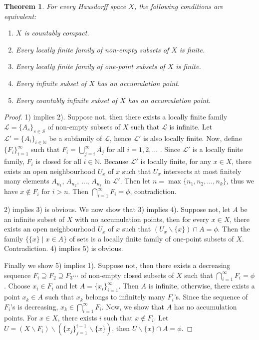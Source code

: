 \documentclass[12pt,oneside,english]{amsbook}
\numberwithin{equation}{section} %
\numberwithin{figure}{section} %
\theoremstyle{plain}
\numberwithin{section}{chapter}
\newtheorem{thm}{Theorem}[section]
\theoremstyle{plain}
\begin{document}
\begin{thm}
  For every Hausdorff space $X$, the following conditions are equivalent:
  \begin{enumerate}
  \item $X$ is countably compact.
  \item Every locally finite family of non-empty subsets of $X$ is finite.
  \item Every locally finite family of one-point subsets of $X$ is finite.
  \item Every infinite subset of $X$ has an accumulation point.
  \item Every countably infinite subset of $X$ has an accumulation point.
  \end{enumerate}
\end{thm}
\begin{proof}
  1) implies 2). Suppose not, then there exists a locally finite family $\mathcal{L} = \{A_{s}\}_{s \in S}$ of non-empty subsets of $X$ such that $\mathcal{L}$ is infinite. Let $\mathcal{L}' = \{A_i\}_{i \in \mathbb{N}}$ be a subfamily of $\mathcal{L}$, hence $\mathcal{L}'$ is also locally finite. Now, define $\{F_i\}_{i = 1}^{\infty}$ such that $F_i = \bigcup_{j = i}^{\infty}\overline{A_j}$ for all $i = 1,2, \ldots$ . Since $\mathcal{L}'$ is a locally finite family, $F_i$ is closed for all $i \in \mathbb{N}$. Because $\mathcal{L}'$ is locally finite, for any $x \in X$, there exists an open neighbourhood $U_x$ of $x$ such that $U_x$ intersects at most finitely many elements $A_{n_1}$, $A_{n_2}$, $\ldots$, $A_{n_k}$ in $\mathcal{L}'$. Then let $n = \max{\{n_1,n_2,\ldots,n_k\}}$, thus we have $x \notin F_i$ for $i > n$. Then $\bigcap_{i = 1}^{\infty}F_i = \phi$, contradiction.

  2) implies 3) is obvious. We now show that 3) implies 4). Suppose not, let $A$ be an infinite subset of $X$ with no accumulation points, then for every $x \in X$, there exists an open neighbourhood $U_x$ of $x$ such that $(U_x\backslash \{x\}) \cap A = \phi$. Then the family $\{\{x\} \; | \; x \in A\}$ of sets is a locally finite family of one-point subsets of $X$. Contradiction. 4) implies 5) is obvious.

  Finally we show 5) implies 1). Suppose not, then there exists a decreasing sequence $F_i \supseteq F_2 \supseteq F_3 \cdots $ of non-empty closed subsets of $X$ such that $\bigcap_{i = 1}^{\infty}F_i = \phi$. Choose $x_i \in F_i$ and let $A = \{x_i\}_{i = 1}^{\infty}$. Then $A$ is infinite, otherwise, there exists a point $x_k \in A$ such that $x_k$ belongs to infinitely many $F_i$'s. Since the sequence of $F_i$'s is decreasing, $x_k \in \bigcap_{i = 1}^{\infty}F_i$. Now, we show that $A$ has no accumulation points. For $x \in X$, there exists $i$ such that $x \notin F_i$. Let $U = (X \backslash F_i) \backslash (\{x_j\}_{j = 1}^{i - 1} \backslash \{x\})$, then $U \backslash \{x\} \cap A = \phi$.    
\end{proof}
\end{document}
